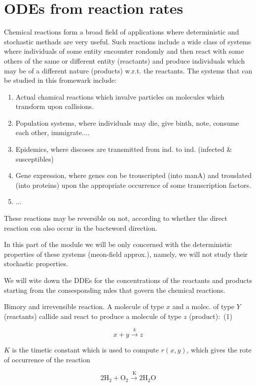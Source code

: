 \section{ODEs from reaction rates}
Chemical reactions form a broad field of applications where deterministic and stochastic methads are very useful. Such reactions include a wide class of systems where individuals of some entity encounter rondomly and then react with some others of the same or different entity (reactants) and produce individuals which may be of a different nature (products) w.r.t. the reactants. The systems that can be studied in this fromewark include:

\begin{enumerate}
  \item Actual chamical reactions which invalve particles on molecules which transform upon callisions.
  \item Population systems, where individuals may die, give binth, note, consume each other, immigrate....
  \item Epidemics, where discoses are transmitted from ind. to ind. (infected \& susceptibles)
  \item Gene expression, where genes con be trouscripted (into manA) and trouslated (into proteins) upon the appropriate occurrence of some transcription factors.
  \item ...
\end{enumerate}

These reactions may be reversible on not, according to whether the direct reaction con also occur in the bacteword direction.

In this part of the module we will be only concerned with the deterministic properties of these zystems (meon-field approx.), namely, we will not study their stochastic properties.

We will wite down the DDEs for the concentrations of the reactants and products starting from the consesponding mles that govern the chemical reactions.

Bimory and irrevensible reaction. A molecule of type $x$ and a molec. of type $Y$ (reactants) callide and react to produce a molecule of type $z$ (product):\
(1)

$$
 x+y \xrightarrow{k} z
$$

$K$ is the timetic constant which is used to compute $r(x, y)$, which gives the rote of occurrence of the reaction

$$ 
 2 \mathrm{H}_{2}+\mathrm{O}_{2} \xrightarrow{\mathrm{~K}} 2 \mathrm{H}_{2} \mathrm{O} 
$$ 

